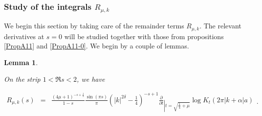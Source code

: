 \documentclass{jams-l}
\newtheorem{lemma}[theorem]{Lemma}
\theoremstyle{definition}
\theoremstyle{remark}
\numberwithin{equation}{section}
\begin{document}
    
        \subsubsection{Study of the integrals $R_{\mu,k}$}
        \label{SubSubSecStudyRmuk}
        
            We begin this section by taking care of the remainder terms $R_{\mu,k}$. The relevant derivatives at $s = 0$ will be studied together with those from propositions \ref{PropA11} and \ref{PropA11-0}. We begin by a couple of lemmas.
            
            \begin{lemma}
            \label{LemRmuk}
            
                On the strip $1 < \Re s < 2$, we have
                
                \[ \begin{array}{lll}
                        R_{\mu,k} \left( s \right) & = & \frac{\left( 4 \mu + 1 \right)^{-s+ \frac{1}{2}}}{1-s} \frac{\sin \left( \pi s \right)}{\pi} \left( \left \vert k \right \vert^{2 \delta} - \frac{1}{4} \right)^{-s+1} \frac{\partial}{\partial t}_{\left \vert t = \sqrt{\frac{1}{4} + \mu} \right.} \log K_t \left( 2 \pi \left \vert k + \alpha \right \vert a \right)
                    \end{array} . \]
            
            \end{lemma}
            
\end{document}
